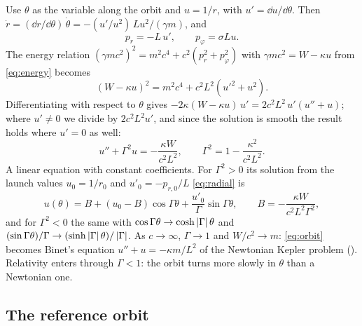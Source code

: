 \documentclass{leveldoc}
\begin{document}
Use $\theta$ as the variable along the orbit and $u = 1/r$, with $u' = \dd u/\dd\theta$. Then
$\dot r = (\dd r/\dd\theta)\,\dot\theta = -(u'/u^2)\,L u^2/(\gamma m)$, and
\begin{equation}\label{eq:radial}
  p_r = -L\,u', \qquad p_\varphi = \sigma L u.
\end{equation}
The energy relation $(\gamma mc^2)^2 = m^2c^4 + c^2(p_r^2 + p_\varphi^2)$ with
$\gamma mc^2 = W - \kappa u$ from \eqref{eq:energy} becomes
\begin{equation}\label{eq:energy-u}
  (W - \kappa u)^2 = m^2c^4 + c^2L^2\left(u'^2 + u^2\right).
\end{equation}
Differentiating with respect to $\theta$ gives
$-2\kappa(W - \kappa u)\,u' = 2c^2L^2\,u'(u'' + u)$; where $u' \ne 0$ we divide by
$2c^2L^2u'$, and since the solution is smooth the result holds where $u' = 0$ as well:
\begin{equation}\label{eq:orbit}
  u'' + \Gamma^2 u = -\frac{\kappa W}{c^2L^2}, \qquad \Gamma^2 = 1 - \frac{\kappa^2}{c^2L^2}.
\end{equation}
A linear equation with constant coefficients. For $\Gamma^2 > 0$ its solution from the launch
values $u_0 = 1/r_0$ and $u'_0 = -p_{r,0}/L$ \eqref{eq:radial} is
\begin{equation}\label{eq:general}
  u(\theta) = B + (u_0 - B)\cos\Gamma\theta + \frac{u'_0}{\Gamma}\sin\Gamma\theta,
  \qquad B = -\frac{\kappa W}{c^2L^2\Gamma^2},
\end{equation}
and for $\Gamma^2 < 0$ the same with $\cos\Gamma\theta \to \cosh\left\lvert \Gamma\right\rvert\theta$ and
$(\sin\Gamma\theta)/\Gamma \to (\sinh\left\lvert \Gamma\right\rvert\theta)/\left\lvert \Gamma\right\rvert$. As $c\to\infty$, $\Gamma \to 1$ and
$W/c^2 \to m$: \eqref{eq:orbit} becomes Binet's equation $u'' + u = -\kappa m/L^2$ of the
Newtonian Kepler problem (). Relativity enters through $\Gamma < 1$: the orbit
turns more slowly in $\theta$ than a Newtonian one.

\subsection{The reference orbit}\label{sec:reference-orbit}
\end{document}
